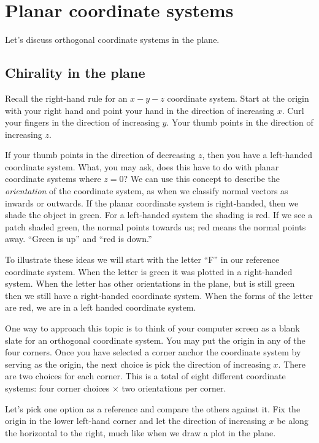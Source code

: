 \section{Planar coordinate systems}
Let's discuss orthogonal coordinate systems in the plane.

\subsection{Chirality in the plane}
Recall the right-hand rule for an $x-y-z$ coordinate system. Start at the origin with your right hand and point your hand in the direction of increasing $x$. Curl your fingers in the direction of increasing $y$. Your thumb points in the direction of increasing $z$.

If your thumb points in the direction of decreasing $z$, then you have a left-handed coordinate system. What, you may ask, does this have to do with planar coordinate systems where $z=0$? We can use this concept to describe the \textit{orientation} of the coordinate system, as when we classify normal vectors as inwards or outwards. If the planar coordinate system is right-handed, then we shade the object in green. For a left-handed system the shading is red. If we see a patch shaded green, the normal points towards us; red means the normal points away. ``Green is up'' and ``red is down.''

To illustrate these ideas we will start with the letter ``F'' in our reference coordinate system. When the letter is green it was plotted in a right-handed system. When the letter has other orientations in the plane, but is still green then we still have a right-handed coordinate system. When the forms of the letter are red, we are in a left handed coordinate system.


One way to approach this topic is to think of your computer screen as a blank slate for an orthogonal coordinate system. You may put the origin in any of the four corners. Once you have selected a corner anchor the coordinate system by serving as the origin, the next choice is pick the direction of increasing $x$. There are two choices for each corner. This is a total of eight different coordinate systems: four corner choices $\times$ two orientations per corner.

Let's pick one option as a reference and compare the others against it. Fix the origin in the lower left-hand corner and let the direction of increasing $x$ be along the horizontal to the right, much like when we draw a plot in the plane.

